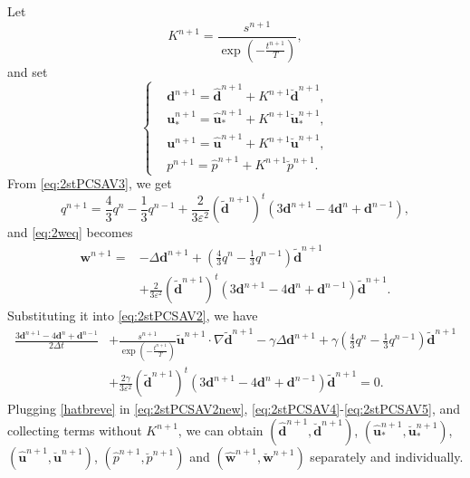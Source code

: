 \documentclass[12pt,reqno]{amsart}
\numberwithin{equation}{section}
\newcommand{\uu}{\mathrm{\textbf{u}}}
\newcommand{\dd}{\mathrm{\textbf{d}}}
\newcommand{\ww}{\mathrm{\textbf{w}}}
\begin{document}
Let
\begin{equation}\label{Kn+1}
K^{n+1}=\frac{s^{n+1}}{\exp\left(-\frac{t^{n+1}}{T}\right)},
\end{equation}
and set
\begin{equation} \label{hatbreve} 
\left\{  
\begin{aligned} 
&\dd^{n+1}=\hat{\dd}^{n+1}+K^{n+1}\breve{\dd}^{n+1},\\&\uu_*^{n+1}=\hat{\uu}_*^{n+1}+K^{n+1}\breve{\uu}_*^{n+1},\\ &\uu^{n+1}=\hat{\uu}^{n+1}+K^{n+1}\breve{\uu}^{n+1},\\
&p^{n+1}=\hat{p}^{n+1}+K^{n+1}\breve{p}^{n+1}.
\end{aligned}  
\right.  
\end{equation} 
From \eqref{eq:2stPCSAV3}, we get
\begin{equation}\label{q2stPCSAV}
q^{n+1}=\frac{4}{3}q^n-\frac{1}{3}q^{n-1}+\frac{2}{3\varepsilon^2} \left(\tilde{\dd}^{n+1}\right)^t \left(3\dd^{n+1}-4\dd^{n}+\dd^{n-1}\right), 
\end{equation}
and \eqref{eq:2weq} becomes
\begin{align}\label{BDFneww}
\ww^{n+1} = &-\Delta\dd^{n+1}+\left(\frac{4}{3}q^n-\frac{1}{3}q^{n-1}\right)\tilde{\dd}^{n+1}\nonumber\\
&+\frac{2}{3\varepsilon^2} \left(\tilde{\dd}^{n+1}\right)^t \left(3\dd^{n+1}-4\dd^{n}+\dd^{n-1}\right)\tilde{\dd}^{n+1}.
\end{align}
Substituting it into \eqref{eq:2stPCSAV2}, we have
\begin{align}
\frac{3\dd^{n+1}-4\dd^{n}+\dd^{n-1}}{2\Delta t}&+\frac{s^{n+1}}{\exp\left(-\frac{t^{n+1}}{T}\right)} \tilde{\uu}^{n+1}\cdot\nabla \tilde{\dd}^{n+1}
-\gamma\Delta\dd^{n+1}+\gamma\left(\frac{4}{3}q^n-\frac{1}{3}q^{n-1}\right)\tilde{\dd}^{n+1}\nonumber\\
&+\frac{2\gamma}{3\varepsilon^2} \left(\tilde{\dd}^{n+1}\right)^t \left(3\dd^{n+1}-4\dd^{n}+\dd^{n-1}\right)\tilde{\dd}^{n+1}
 =0.  \label{eq:2stPCSAV2new} 
\end{align}
Plugging \eqref{hatbreve} in \eqref{eq:2stPCSAV2new}, \eqref{eq:2stPCSAV4}-\eqref{eq:2stPCSAV5}, and collecting terms without $K^{n+1}$, we can obtain $(\hat{\dd}^{n+1}, \breve{\dd}^{n+1})$,  $(\hat{\uu}_*^{n+1}, \breve{\uu}_*^{n+1})$,  $(\hat{\uu}^{n+1}, \breve{\uu}^{n+1})$,  $(\hat{p}^{n+1}, \breve{p}^{n+1})$ and $(\hat{\ww}^{n+1},\breve{\ww}^{n+1})$ separately and individually.
\end{document}
